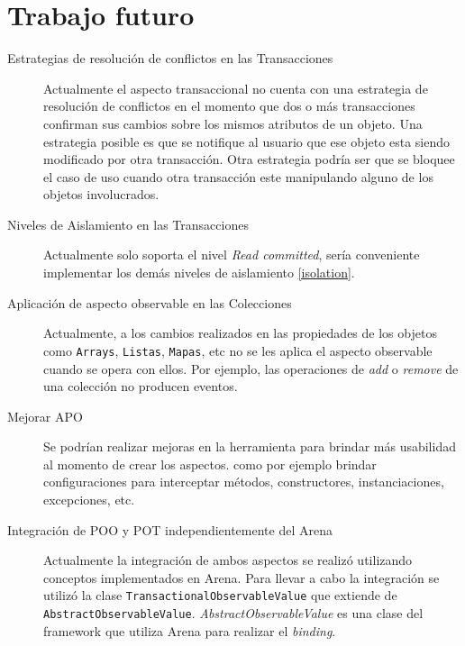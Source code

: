 \section{Trabajo futuro}
\label{Futurework}

\begin{description}

	\item[Estrategias de resolución de conflictos en las Transacciones]
		Actualmente el aspecto transaccional no cuenta con una estrategia de
		resolución de conflictos en	 el momento que dos o más transacciones
		confirman sus cambios sobre los mismos atributos de un objeto.
		Una estrategia posible es que se notifique al usuario que ese
		objeto esta siendo modificado por otra transacción.
		Otra estrategia podría ser que se bloquee el caso de uso cuando otra
		transacción este manipulando alguno de los objetos involucrados.

	\item[Niveles de Aislamiento en las Transacciones]
		Actualmente solo soporta el nivel \emph{Read committed}, sería conveniente
		implementar los demás niveles de aislamiento \ref{isolation}.
	
	\item[Aplicación de aspecto observable en las Colecciones]
		Actualmente, a los cambios realizados en las propiedades de los objetos
		como \lstinline|Arrays|, \lstinline|Listas|, \lstinline|Mapas|, etc no se les
		aplica el aspecto observable cuando se opera con ellos. Por ejemplo, las
		operaciones de \emph{add} o \emph{remove} de una colección no producen
		eventos.
		
	\item[Mejorar APO]
		Se podrían realizar mejoras en la herramienta para brindar más usabilidad al
		momento de crear los aspectos. como por ejemplo brindar configuraciones para
		interceptar métodos, constructores, instanciaciones, excepciones, etc.
		
	\item[Integración de POO y POT independientemente del Arena]
		Actualmente la integración de ambos aspectos se realizó utilizando conceptos
		implementados en Arena. Para llevar a cabo la integración se utilizó la clase
		\lstinline|TransactionalObservableValue| que extiende de
		\lstinline|AbstractObservableValue|. \emph{AbstractObservableValue} es una
		clase del framework que utiliza Arena para realizar el \emph{binding}.

\end{description}